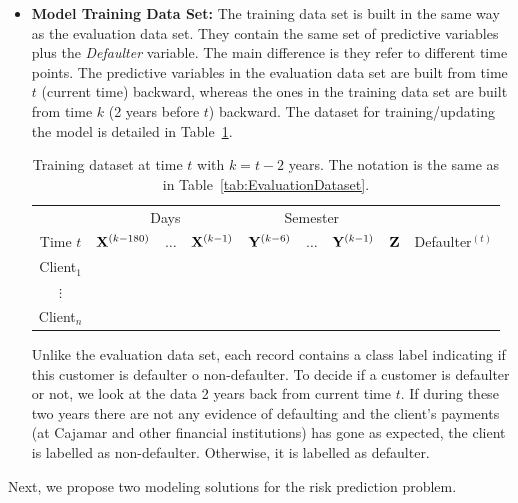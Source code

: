 \begin{itemize}
\item \textbf{Model Training Data Set:}  The training data set is built in the same way as the evaluation data set. They contain the same set of predictive variables plus the \emph{Defaulter} variable. The main difference is they refer to different time points. The predictive variables in the evaluation data set are built from time $t$ (current time) backward, whereas the ones in the training data set are built from time $k$ (2 years before $t$) backward. The dataset for training/updating the model is detailed in Table~\ref{tab:TrainingDataset}.
\begin{table}[h]
\centering
\begin{tabular}{c|ccc|ccc|c|c}
	&\multicolumn{3}{c|}{Days} & \multicolumn{3}{c|}{Semester} & \\
     Time $t$              & $\mathbf{X}^{(k-180)}$ & $\ldots$ & $\mathbf{X}^{(k-1)} $ & $\mathbf{Y}^{(k-6)}$  & $\ldots$ & $\mathbf{Y}^{(k-1)} $ & $\mathbf{Z}$ & Defaulter$^{(t)}$\\  
\hline
Client$_1$  &                                                  &              &                     &                               &                     &        &  \\ 
$\vdots$      &                                                 &               &                     &                                &                     &       & \\ 
Client$_n$  &                                                &               &                     &                                &                     &     & \\ 
\end{tabular} 
\caption{Training dataset at time $t$ with $k=t - 2$ years.  The notation is the same as in Table~\ref{tab:EvaluationDataset}.}
\label{tab:TrainingDataset} 
\end{table}

Unlike the evaluation data set, each record contains a class label indicating if this customer is defaulter o non-defaulter. To decide if a customer is defaulter or not, we look at the data 2 years back from current time $t$. If during these two years there are not any evidence of defaulting and the client's payments (at Cajamar and other financial institutions) has gone as expected, the client is labelled as non-defaulter. Otherwise, it is labelled as defaulter.

\end{itemize}

Next, we propose two modeling solutions for the risk prediction problem.



